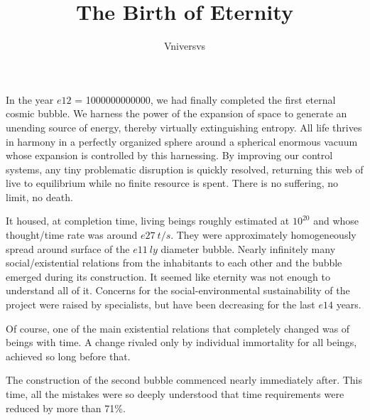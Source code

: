 \documentclass[]{article}
\title{The Birth of Eternity}
\author{Vniversvs}
\begin{document}
\maketitle

\begin{abstract}

\end{abstract}

\section{}

In the year $e12$ = 1000000000000, we had finally completed the first eternal cosmic bubble. We harness the power of the expansion of space to generate an unending source of energy, thereby virtually extinguishing entropy. All life thrives in harmony in a perfectly organized sphere around a spherical enormous vacuum whose expansion is controlled by this harnessing. By improving our control systems, any tiny problematic disruption is quickly resolved, returning this web of live to equilibrium while no finite resource is spent. There is no suffering, no limit, no death.

It housed, at completion time, living beings roughly estimated at $10^{20}$ and whose thought/time rate was around $e27 \ t/s$. They were approximately homogeneously spread around surface of the $e11 \ ly$ diameter bubble. Nearly infinitely many social/existential relations from the inhabitants to each other and the bubble emerged during its construction. It seemed like eternity was not enough to understand all of it. Concerns for the social-environmental sustainability of the project were raised by specialists, but have been decreasing for the last $e14$ years. 

Of course, one of the main existential relations that completely changed was of beings with time. A change rivaled only by individual immortality for all beings, achieved so long before that. 




The construction of the second bubble commenced nearly immediately after. This time, all the mistakes were so deeply understood that time requirements were reduced by more than 71\%.
\end{document}
